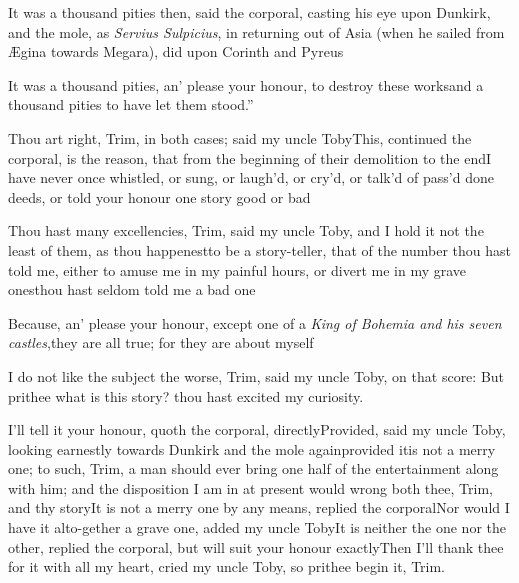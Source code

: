 \documentclass{article}
\begin{document}
It was a thousand pities then, said the corporal, casting his
eye upon Dunkirk, and the mole, as \textit{Servius Sulpicius},
in returning out of Asia (when he sailed from\pb
Ægina towards Megara), did upon Co\-rinth
and Pyreus\tsh

\tsk \lqq It was a thousand pities, an’ please
your honour, to destroy these works\tsk\break and a thousand
pities to have let them stood.”\tsh

\tsh Thou art right, Trim, in both cases; said
my uncle Toby\tsh This, continued the corporal, is
the reason, that from the beginning of their demolition to the
end\tsh I have never once whistled, or sung, or
laugh’d, or cry’d, or talk’d of pass'd done deeds,
or told your honour one story good or bad\tsh

\tsh Thou hast many excellencies, Trim, said my
uncle Toby, and I hold it not the least of them, as thou
happenest\pb to be a story-teller, that of the number thou hast told me, either to amuse me in my
painful hours, or divert me in my grave ones\tsk thou hast seldom
told me a bad one\tsh

\tsh Because, an’ please your honour, except one
of a \textit{King of Bohemia and his seven castles},\tsk they are
all true; for they are about myself\tsh

I do not like the subject the worse, Trim, said my uncle
Toby, on that score: But prithee what is this story? thou
hast excited my curiosity.

I’ll tell it your honour, quoth the corporal,
directly\tsh Provided, said my uncle Toby, looking
earnestly towards Dun\-kirk and the mole
again\tsh provided it\pb is not a merry one; to such,
Trim, a man should ever bring one half of the entertainment
along with him; and the disposition I am in at present would wrong
both thee, Trim, and thy story\tsk It is\break
not a merry one by any means, replied the corporal\tsk Nor would
I have it alto-\break gether a grave one, added my uncle Toby\tsh It
is neither the one nor the other, replied the corporal, but will
suit your honour exactly\tsh Then I’ll thank thee for it with
all my heart, cried my uncle Toby, so prithee begin it, Trim.
\end{document}
